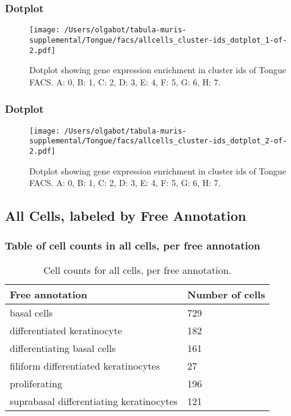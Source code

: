 \newpage
\newpage
\subsubsection{Dotplot}
\begin{figure}[h]
\centering
\texttt{[image: /Users/olgabot/tabula-muris-supplemental/Tongue/facs/allcells\_cluster-ids\_dotplot\_1-of-2.pdf]}

\caption{ Dotplot  showing gene expression enrichment in cluster ids of Tongue FACS. A: 0, B: 1, C: 2, D: 3, E: 4, F: 5, G: 6, H: 7.}
\end{figure}


\newpage
\newpage
\subsubsection{Dotplot}
\begin{figure}[h]
\centering
\texttt{[image: /Users/olgabot/tabula-muris-supplemental/Tongue/facs/allcells\_cluster-ids\_dotplot\_2-of-2.pdf]}

\caption{ Dotplot  showing gene expression enrichment in cluster ids of Tongue FACS. A: 0, B: 1, C: 2, D: 3, E: 4, F: 5, G: 6, H: 7.}
\end{figure}


\newpage
\subsection{All Cells, labeled by Free Annotation}
\subsubsection{Table of cell counts in all cells, per free annotation}\begin{table}[h]
\centering
\label{my-label}
\begin{tabular}{@{}ll@{}}
\toprule

Free annotation& Number of cells \\ \midrule
basal cells & 729 \\

differentiated keratinocyte & 182 \\

differentiating basal cells & 161 \\

filiform differentiated keratinocytes & 27 \\

proliferating & 196 \\

suprabasal differentiating keratinocytes & 121 \\
\bottomrule
\end{tabular}
\caption{Cell counts for all cells, per free annotation.}
\end{table}

